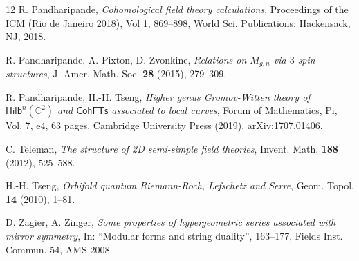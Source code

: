 \documentclass[12pt]{amsart}
\numberwithin{equation}{section}
\begin{document}
\begin{thebibliography}{12}
 R. Pandharipande, {\em Cohomological field theory calculations}, Proceedings of the ICM (Rio de Janeiro 2018), Vol 1, 869--898, World Sci. Publications: Hackensack, NJ, 2018.

 R. Pandharipande, A. Pixton, D. Zvonkine, {\em Relations on $\overline{M}_{g,n}$ via $3$-spin structures}, J. Amer. Math. Soc. {\bf 28} (2015), 279--309.

 R. Pandharipande, H.-H. Tseng, {\em Higher genus Gromov-Witten theory of $\mathsf{Hilb}^n(\mathbb{C}^2)$ and $\mathsf{CohFTs}$ associated to local curves}, Forum of Mathematics, Pi, Vol. 7, e4, 63 pages, Cambridge University Press (2019), arXiv:1707.01406.

 C. Teleman, {\em The structure of 2D semi-simple field theories}, Invent. Math. {\bf 188} (2012), 525--588.

 H.-H. Tseng, {\em Orbifold quantum Riemann-Roch, Lefschetz and Serre}, Geom. Topol. {\bf 14} (2010), 1--81. 

 D. Zagier, A. Zinger, {\em Some properties of hypergeometric series associated with mirror symmetry}, In: ``Modular forms and string duality'', 163--177, Fields Inst. Commun. 54, AMS 2008.

\end{thebibliography}
\end{document}
